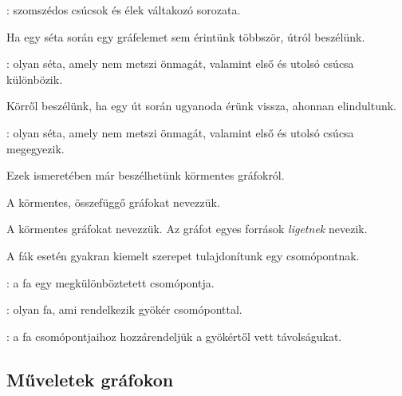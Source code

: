 \begin{definicio}
	: szomszédos csúcsok és élek váltakozó sorozata.
\end{definicio}

Ha egy séta során egy gráfelemet sem érintünk többször, útról beszélünk.

\begin{definicio}
: olyan séta, amely nem metszi önmagát, valamint első és utolsó csúcsa különbözik.
\end{definicio}

Körről beszélünk, ha egy út során ugyanoda érünk vissza, ahonnan elindultunk.

\begin{definicio}
: olyan séta, amely nem metszi önmagát, valamint első és utolsó csúcsa megegyezik.
\end{definicio}

Ezek ismeretében már beszélhetünk körmentes gráfokról.

\begin{definicio}
	A körmentes, összefüggő gráfokat  nevezzük.
\end{definicio}

\begin{definicio}
	A körmentes gráfokat  nevezzük. Az  gráfot egyes források \emph{ligetnek} nevezik.
\end{definicio}

A fák esetén gyakran kiemelt szerepet tulajdonítunk egy csomópontnak.

\begin{definicio}
	: a fa egy megkülönböztetett csomópontja.
\end{definicio}

\begin{definicio}
	: olyan fa, ami rendelkezik gyökér csomóponttal.
\end{definicio}

\begin{definicio}
	: a fa csomópontjaihoz hozzárendeljük a gyökértől vett távolságukat.
\end{definicio}

\subsection{Műveletek gráfokon}

